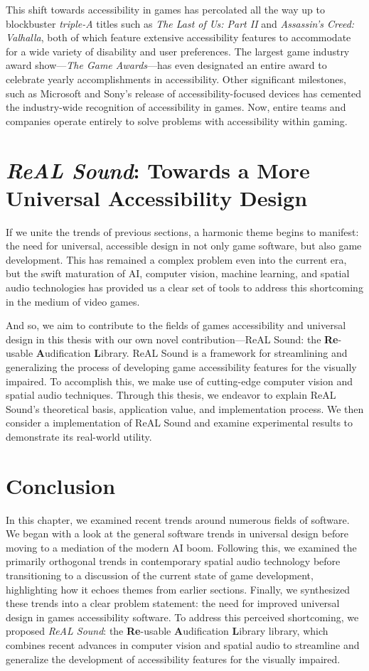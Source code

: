 \documentclass{report}
\newcommand{\rs}{ReAL Sound\xspace}
\newcommand{\rsfull}{\textbf{Re}-usable \textbf{A}udification \textbf{L}ibrary\xspace}
\begin{document}
This shift towards accessibility in games has percolated all the way up to blockbuster \emph{triple-A} titles such as \emph{The Last of Us: Part II} and \emph{Assassin's Creed: Valhalla}, both of which feature extensive accessibility features to accommodate for a wide variety of disability and user preferences. The largest game industry award show---\emph{The Game Awards}---has even designated an entire award to celebrate yearly accomplishments in accessibility. Other significant milestones, such as Microsoft and Sony's release of accessibility-focused devices has cemented the industry-wide recognition of accessibility in games. Now, entire teams and companies operate entirely to solve problems with accessibility within gaming.  

\section{\emph{\rs}: Towards a More Universal Accessibility Design}
If we unite the trends of previous sections, a harmonic theme begins to manifest: the need for universal, accessible design in not only game software, but also game development. This has remained a complex problem even into the current era, but the swift maturation of AI, computer vision, machine learning, and spatial audio technologies has provided us a clear set of tools to address this shortcoming in the medium of video games. 

And so, we aim to contribute to the fields of games accessibility and universal design in this thesis with our own novel contribution---\rs: the \rsfull. \rs is a framework for streamlining and generalizing the process of developing game accessibility features for the visually impaired. To accomplish this, we make use of cutting-edge computer vision and spatial audio techniques. Through this thesis, we endeavor to explain \rs's theoretical basis, application value, and implementation process. We then consider a implementation of \rs and examine experimental results to demonstrate its real-world utility.


\section{Conclusion}
In this chapter, we examined recent trends around numerous fields of software. We began with a look at the general software trends in universal design before moving to a mediation of the modern AI boom. Following this, we examined the primarily orthogonal trends in contemporary spatial audio technology before transitioning to a discussion of the current state of game development, highlighting how it echoes themes from earlier sections. Finally, we synthesized these trends into a clear problem statement: the need for improved universal design in games accessibility software. To address this perceived shortcoming, we proposed \emph{\rs}: the \rsfull library, which combines recent advances in computer vision and spatial audio to streamline and generalize the development of accessibility features for the visually impaired. 
\end{document}

